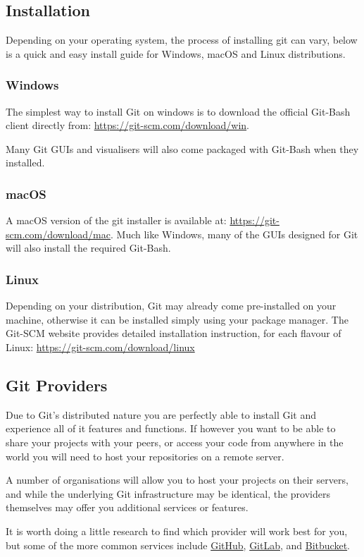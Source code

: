 \documentclass[10pt, a4paper, titlepage]{article}
\begin{document}
\subsection{Installation}
Depending on your operating system, the process of installing git can vary,
below is a quick and easy install guide for Windows, macOS and Linux
distributions.

\subsubsection{Windows}
The simplest way to install Git on windows is to download the official Git-Bash
client directly from: \url{https://git-scm.com/download/win}.

Many Git GUIs and visualisers will also come packaged with Git-Bash when they
installed.

\subsubsection{macOS}
A macOS version of the git installer is available at:
\url{https://git-scm.com/download/mac}.
Much like Windows, many of the GUIs designed for Git will also install the
required Git-Bash.

\subsubsection{Linux}
Depending on your distribution, Git may already come pre-installed on your
machine, otherwise it can be installed simply using your package manager.
The Git-SCM website provides detailed installation instruction, for each
flavour of Linux: \url{https://git-scm.com/download/linux}


\subsection{Git Providers}
Due to Git's distributed nature you are perfectly able to install Git and
experience all of it features and functions. 
If however you want to be able to
share your projects with your peers, or access your code from anywhere in the
world you will need to host your repositories on a remote server.

A number of organisations will allow you to host your projects on their
servers, and while the underlying Git infrastructure may be identical, the
providers themselves may offer you additional services or features.

It is worth doing a little research to find which provider will work best for
you, but some of the more common services include
\href{https://github.com}{GitHub}, \href{https://gitlab.com}{GitLab}, and
\href{https://bitbucket.org}{Bitbucket}.
\end{document}
